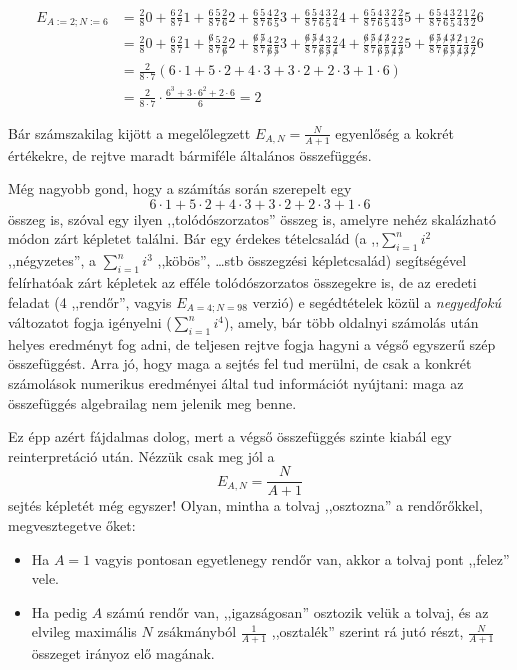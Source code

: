 \documentclass{article}
\newcommand{\parenthesed}[1]{\left(#1\right)}
\begin{document}
	\begin{align*}
		E_{A:=2; N:=6} &= \frac{2}{8}0 + \frac{6}{8}\frac{2}{7}1 + \frac{6}{8}\frac{5}{7}\frac{2}{6}2 + \frac{6}{8}\frac{5}{7}\frac{4}{6}\frac{2}{5}3 + \frac{6}{8}\frac{5}{7}\frac{4}{6}\frac{3}{5}\frac{2}{4}4 + \frac{6}{8}\frac{5}{7}\frac{4}{6}\frac{3}{5}\frac{2}{4}\frac{2}{3}5 + \frac{6}{8}\frac{5}{7}\frac{4}{6}\frac{3}{5}\frac{2}{4}\frac{1}{3}\frac{2}{2}6\\
		  &= \frac{2}{8}0 + \frac{6}{8}\frac{2}{7}1 + \frac{\not6}{8}\frac{5}{7}\frac{2}{\not6}2 + \frac{\not6}{8}\frac{\not5}{7}\frac{4}{\not6}\frac{2}{\not5}3 + \frac{\not6}{8}\frac{\not5}{7}\frac{\not4}{\not6}\frac{3}{\not5}\frac{2}{\not4}4 + \frac{\not6}{8}\frac{\not5}{7}\frac{\not4}{\not6}\frac{\not3}{\not5}\frac{2}{\not4}\frac{2}{\not3}5 + \frac{\not6}{8}\frac{\not5}{7}\frac{\not4}{\not6}\frac{\not3}{\not5}\frac{\not2}{\not4}\frac{1}{\not3}\frac{2}{\not2}6\\
		  &= \frac2{8\cdot7}\parenthesed{6\cdot1 + 5\cdot2 + 4\cdot3 + 3\cdot2 + 2\cdot3 + 1\cdot6}\\
		  &= \frac2{8\cdot7}\cdot\frac{6^3+3\cdot6^2+2\cdot6}6 = 2
	\end{align*}

	Bár számszakilag kijött a megelőlegzett $E_{A,N} = \frac N{A+1}$ egyenlőség a kokrét értékekre, de rejtve maradt bármiféle általános összefüggés.

	Még nagyobb gond, hogy a számítás során szerepelt egy \[6\cdot1 + 5\cdot2 + 4\cdot3 + 3\cdot2 + 2\cdot3 + 1\cdot6\] összeg is, szóval egy ilyen ,,tolódószorzatos'' összeg is, amelyre nehéz skalázható módon zárt képletet találni.
	Bár egy érdekes tételcsalád (a ,,$\sum_{i=1}^n i^2$  ,,négyzetes'', a $\sum_{i=1}^n i^3$ ,,köbös'', \dots stb összegzési képletcsalád) segítségével felírhatóak zárt képletek az efféle tolódószorzatos összegekre is,
	de az eredeti feladat (4 ,,rendőr'', vagyis $E_{A=4;N=98}$ verzió) e segédtételek közül a \emph{negyedfokú} változatot fogja igényelni ($\sum_{i=1}^n i^4$), amely, bár több oldalnyi számolás után helyes eredményt fog adni, de teljesen rejtve fogja hagyni a végső egyszerű szép összefüggést. Arra jó, hogy maga a sejtés fel tud merülni, de csak a konkrét számolások numerikus eredményei által tud információt nyújtani: maga az összefüggés algebrailag nem jelenik meg benne. 

	Ez épp azért fájdalmas dolog, mert a végső összefüggés szinte kiabál egy reinterpretáció után.
	Nézzük csak meg jól a \[E_{A,N} = \frac N{A+1}\] sejtés képletét még egyszer!
	Olyan, mintha a tolvaj ,,osztozna'' a rendőrőkkel, megvesztegetve őket:
	\begin{itemize}
		\item Ha $A=1$ vagyis pontosan egyetlenegy rendőr van, akkor a tolvaj pont ,,felez'' vele.
		\item Ha pedig $A$ számú rendőr van, ,,igazságosan'' osztozik velük a tolvaj, és az elvileg maximális $N$ zsákmányból $\frac1{A+1}$ ,,osztalék'' szerint rá jutó részt, $\frac N{A+1}$ összeget irányoz elő magának.
	\end{itemize}
\end{document}
